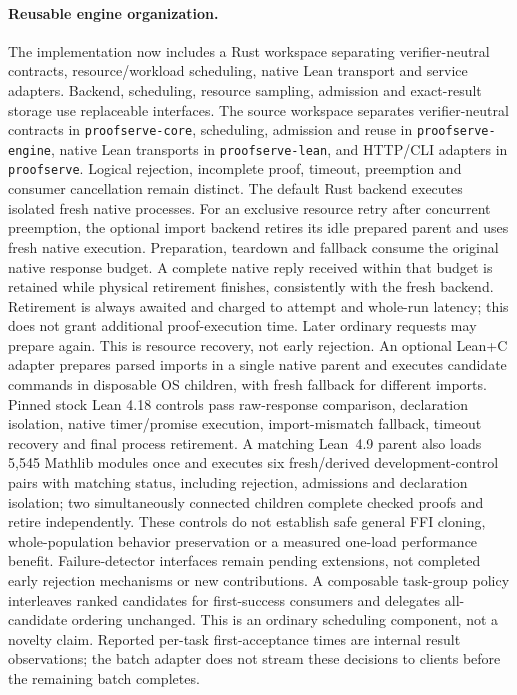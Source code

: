 \documentclass[10pt,twocolumn]{article}
\begin{document}
\paragraph{Reusable engine organization.}
The implementation now includes a Rust workspace separating verifier-neutral
contracts, resource/workload scheduling, native Lean transport and service
adapters. Backend, scheduling, resource sampling, admission and exact-result
storage use replaceable interfaces. The source workspace separates
verifier-neutral contracts in \texttt{proofserve-core}, scheduling, admission
and reuse in \texttt{proofserve-engine}, native Lean transports in
\texttt{proofserve-lean}, and HTTP/CLI adapters in \texttt{proofserve}.
Logical rejection, incomplete proof,
timeout, preemption and consumer cancellation remain distinct.
The default Rust backend executes isolated fresh native processes.
For an exclusive resource retry after concurrent preemption, the optional
import backend retires its idle prepared parent and uses fresh native execution.
Preparation, teardown and fallback consume the original native response
budget. A complete native reply received within that budget is retained while
physical retirement finishes, consistently with the fresh backend.
Retirement is always awaited and charged to attempt and whole-run latency;
this does not grant additional proof-execution time. Later ordinary requests
may prepare again. This is resource recovery, not early rejection.
An optional Lean+C adapter prepares parsed imports in a single native parent
and executes candidate commands in disposable OS children, with fresh fallback
for different imports. Pinned stock Lean 4.18 controls pass raw-response
comparison, declaration isolation, native timer/promise execution,
import-mismatch fallback, timeout recovery and final process retirement.
A matching Lean~4.9 parent also loads 5,545 Mathlib modules once and
executes six fresh/derived development-control pairs with matching status,
including rejection, admissions and declaration isolation; two simultaneously
connected children complete checked proofs and retire independently.
These controls do not establish safe general FFI cloning, whole-population
behavior preservation or a measured one-load performance benefit.
Failure-detector interfaces remain pending extensions, not completed early
rejection mechanisms or new contributions.
A composable task-group policy interleaves ranked candidates for first-success
consumers and delegates all-candidate ordering unchanged. This is an ordinary
scheduling component, not a novelty claim. Reported per-task first-acceptance
times are internal result observations; the batch adapter does not stream
these decisions to clients before the remaining batch completes.
\end{document}
